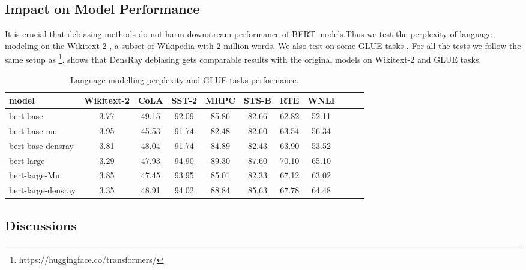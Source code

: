 \subsection{Impact on Model Performance}
It is crucial that debiasing methods do not harm downstream performance of BERT models.Thus we test the perplexity of language modeling on the Wikitext-2 \citep{merity2016pointer}, a subset of Wikipedia with 2 million words. We also test on some GLUE tasks \citep{wang2018glue}. For all the tests we follow the same setup as \citet{wolf2019huggingfaces}\footnote{https://huggingface.co/transformers/}.  shows that DensRay debiasing gets comparable results with the original models on Wikitext-2 and GLUE tasks.
\begin{table}[ht]
\centering
\footnotesize
\begin{tabular}{lcccccccccc}
\hline
model & Wikitext-2&CoLA &SST-2&MRPC&STS-B&RTE&WNLI\\
\hline
bert-base &3.77&49.15&92.09&85.86&82.66&62.82&52.11\\
bert-base-mu &3.95&45.53&91.74&82.48&82.60&63.54&56.34\\
bert-base-densray &3.81&48.04&91.74&84.89&82.43&63.90&53.52\\
\hline
bert-large &3.29& 47.93&94.90&89.30&87.60&70.10&65.10\\
bert-large-Mu &3.85& 47.45&93.95&85.01&82.33&67.12&63.02\\
bert-large-densray &3.35& 48.91&94.02&88.84&85.63&67.78&64.48\\
\hline
\end{tabular}
\caption{
Language modelling perplexity and GLUE tasks performance.}
\end{table}
\subsection{Discussions}
